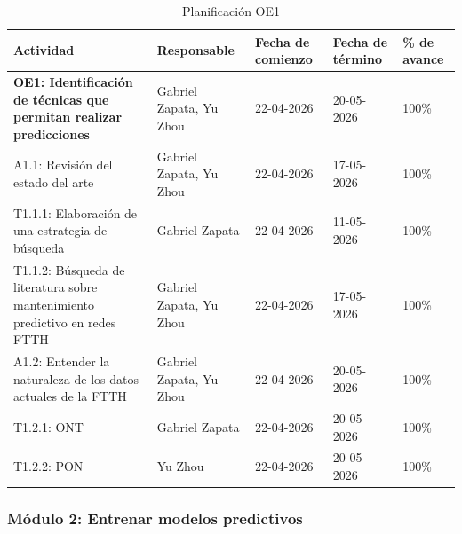 \documentclass[12pt,a4paper]{article}
\begin{document}
        \begin{table}[H]
            \centering
            \renewcommand{\arraystretch}{1.5}
            \begin{tabular}{|p{5cm}|p{3cm}|p{2cm}|p{2cm}|p{2cm}|}
            \hline
            \textbf{Actividad} & \textbf{Responsable} & \textbf{Fecha de comienzo} & \textbf{Fecha de término} & \textbf{\% de avance} \\ \hline
            \textbf{OE1: Identificación de técnicas que permitan realizar predicciones} & Gabriel Zapata, Yu Zhou & 22-04-2026 & 20-05-2026 & 100\% \\ \hline
            A1.1: Revisión del estado del arte & Gabriel Zapata, Yu Zhou & 22-04-2026 & 17-05-2026 & 100\% \\ \hline
            T1.1.1: Elaboración de una estrategia de búsqueda & Gabriel Zapata & 22-04-2026 & 11-05-2026 & 100\% \\ \hline
            T1.1.2: Búsqueda de literatura sobre mantenimiento predictivo en redes FTTH & Gabriel Zapata, Yu Zhou & 22-04-2026 & 17-05-2026 & 100\% \\ \hline
            A1.2: Entender la naturaleza de los datos actuales de la FTTH & Gabriel Zapata, Yu Zhou & 22-04-2026 & 20-05-2026 & 100\% \\ \hline
            T1.2.1: ONT & Gabriel Zapata & 22-04-2026 & 20-05-2026 & 100\% \\ \hline
            T1.2.2: PON & Yu Zhou & 22-04-2026 & 20-05-2026 & 100\% \\ \hline
            \end{tabular}
            \caption{Planificación OE1}
            \label{tab:planificacion_avance}
        \end{table}

    \subsubsection{Módulo 2: Entrenar modelos predictivos}
\end{document}
